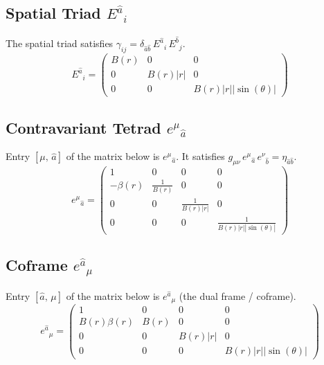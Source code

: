 \documentclass[11pt,a4paper]{article}
\begin{document}
\subsection{Spatial Triad $E^{\hat{a}}{}_i$}
The spatial triad satisfies $\gamma_{ij} = \delta_{\hat{a}\hat{b}}\,E^{\hat{a}}{}_i\,E^{\hat{b}}{}_j$.
\begin{equation}
  E^{\hat{a}}{}_i = \begin{pmatrix}
    B{\left(r \right)} & 0 & 0 \\
    0 & B{\left(r \right)} \left|{r}\right| & 0 \\
    0 & 0 & B{\left(r \right)} \left|{r}\right| \left|{\sin{\left(\theta \right)}}\right|
\end{pmatrix}
\end{equation}
\subsection{Contravariant Tetrad $e^\mu{}_{\hat{a}}$}
Entry $[\mu,\,\hat{a}]$ of the matrix below is $e^\mu{}_{\hat{a}}$. It satisfies $g_{\mu\nu}\,e^\mu{}_{\hat{a}}\,e^\nu{}_{\hat{b}} = \eta_{\hat{a}\hat{b}}$.
\begin{equation}
  e^\mu{}_{\hat{a}} = \begin{pmatrix}
    1 & 0 & 0 & 0 \\
    - \beta{\left(r \right)} & \frac{1}{B{\left(r \right)}} & 0 & 0 \\
    0 & 0 & \frac{1}{B{\left(r \right)} \left|{r}\right|} & 0 \\
    0 & 0 & 0 & \frac{1}{B{\left(r \right)} \left|{r}\right| \left|{\sin{\left(\theta \right)}}\right|}
\end{pmatrix}
\end{equation}
\subsection{Coframe $e^{\hat{a}}{}_\mu$}
Entry $[\hat{a},\,\mu]$ of the matrix below is $e^{\hat{a}}{}_\mu$ (the dual frame / coframe).
\begin{equation}
  e^{\hat{a}}{}_\mu = \begin{pmatrix}
    1 & 0 & 0 & 0 \\
    B{\left(r \right)} \beta{\left(r \right)} & B{\left(r \right)} & 0 & 0 \\
    0 & 0 & B{\left(r \right)} \left|{r}\right| & 0 \\
    0 & 0 & 0 & B{\left(r \right)} \left|{r}\right| \left|{\sin{\left(\theta \right)}}\right|
\end{pmatrix}
\end{equation}
\end{document}
